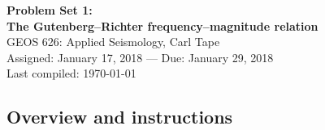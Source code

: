 \documentclass[11pt,titlepage,fleqn]{article}
\begin{document}

\begin{spacing}{1.2}
\centering
{\large \bf Problem Set 1: \\
The Gutenberg--Richter frequency--magnitude relation} \\
GEOS 626: Applied Seismology, Carl Tape \\
Assigned: January 17, 2018 --- Due: January 29, 2018 \\
Last compiled: \today
\end{spacing}


\subsection*{Overview and instructions}
\end{document}
